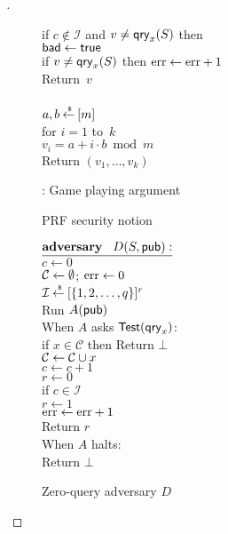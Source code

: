 \begin{proof}[]
\begin{figure}
{{if $c \not\in \mathcal{I}$ and $v \neq \mathsf{qry}_x(S)$ then \\
\nudge $\mathsf{bad} \gets \mathsf{true}$\\
if $v \neq \mathsf{qry}_x(S)$ then $\mathrm{err} \gets \mathrm{err} +1$\\
Return~$v$\\
%
\\
$a,b {\:\stackrel{{\scriptscriptstyle \hspace{0.2em}\$}} {\leftarrow}\:} [m]$\\
for $i = 1$ to~$k$\\
\nudge $v_i = a+i \cdot b \bmod m$\\
Return $\left(v_1,\ldots,v_k\right)$
}
}
\caption{: Game playing argument}\label{fig:Game}
\end{figure}


\begin{figure}
\centering
{}
\caption{PRF security notion}\label{fig:prf}
\end{figure}

\begin{figure}
\centering
{}
{
${\underline{\textbf{adversary}\hspace*{2ex} {D(S, {\sf pub})}:}}$\\[4pt]
$c \gets 0$\\%
${\cal C} \gets \emptyset$; $\mathrm{err} \gets 0$\\
$\mathcal{I}{\:\stackrel{{\scriptscriptstyle \hspace{0.2em}\$}} {\leftarrow}\:} [\{1,2,\ldots,q\}]^r$\\
Run $A({\sf pub})$\\
When $A$ asks $\mathsf{Test}(\mathsf{qry}_x)$:\\
\nudge if $x \in \mathcal{C}$ then Return $\bot$\\
\nudge ${\cal C} \gets {\cal C} \cup x$\\
\nudge $c \gets c+1$\\
\nudge $r \gets 0$\\
\nudge if $c \in \mathcal{I}$\\
\nudge \nudge $r \gets 1$\\
\nudge \nudge $\mathrm{err} \gets \mathrm{err} + 1$\\
\nudge Return $r$\\
When $A$ halts:\\
\nudge Return $\bot$
}
\caption{Zero-query adversary $D$} \label{fig:D}
\end{figure}	

\end{proof}

